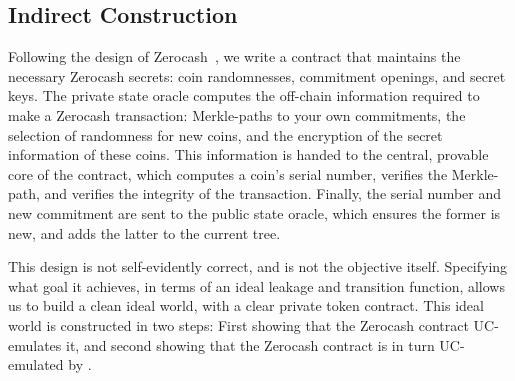 \subsection{Indirect Construction}

Following the design of Zerocash~\cite{SP:BCGGMT14}, we write a contract that
maintains the necessary Zerocash secrets: coin randomnesses, commitment
openings, and secret keys. The private state oracle computes the off-chain
information required to make a Zerocash transaction: Merkle-paths to your own
commitments, the selection of randomness for new coins, and the encryption of
the secret information of these coins. This information is handed to the
central, provable core of the contract, which computes a coin's serial number,
verifies the Merkle-path, and verifies the integrity of the transaction.
Finally, the serial number and new commitment are sent to the public state
oracle, which ensures the former is new, and adds the latter to the current
tree.

This design is not self-evidently correct, and is not the objective itself.
Specifying what goal it achieves, in terms of an ideal leakage and transition
function, allows us to build a clean ideal world, with a clear private token
contract. This ideal world is constructed in two steps: First showing that the
Zerocash contract UC-emulates it, and second showing that the Zerocash contract
is in turn UC-emulated by \kachina.

